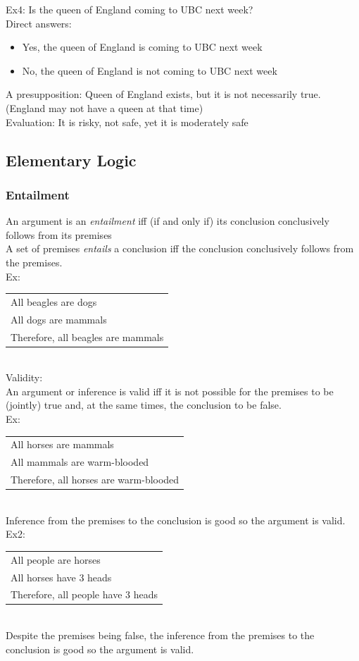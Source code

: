 \documentclass[11pt, fleqn]{article}
\begin{document}
Ex4: Is the queen of England coming to UBC next week?\\
Direct answers:
\begin{itemize}
    \item Yes, the queen of England is coming to UBC next week
    \item No, the queen of England is not coming to UBC next week
\end{itemize}
A presupposition: Queen of England exists, but it is not necessarily true. (England may not have a queen at that time)\\
Evaluation: It is risky, not safe, yet it is moderately safe
\subsection{Elementary Logic}
\subsubsection{Entailment}
An argument is an \textit{entailment} iff (if and only if) its conclusion conclusively follows from its premises\\
A set of premises \textit{entails} a conclusion iff the conclusion conclusively follows from the premises.\\
Ex:\\
\begin{tabular}{p{8cm}}
    All beagles are dogs\\
    All dogs are mammals\\
    \hline
    Therefore, all beagles are mammals
\end{tabular}\\
Validity:\\
An argument or inference is valid iff it is not possible for the premises to be (jointly) true and, at the same times, the conclusion to be false.\\

Ex:\\
\begin{tabular}{p{8cm}}
    All horses are mammals\\
    All mammals are warm-blooded\\
    \hline
    Therefore, all horses are warm-blooded
\end{tabular}\\
Inference from the premises to the conclusion is good so the argument is valid.\\

Ex2:\\
\begin{tabular}{p{8cm}}
    All people are horses\\
    All horses have 3 heads\\
    \hline
    Therefore, all people have 3 heads
\end{tabular}\\
Despite the premises being false, the inference from the premises to the conclusion is good so the argument is valid.\\
\end{document}
